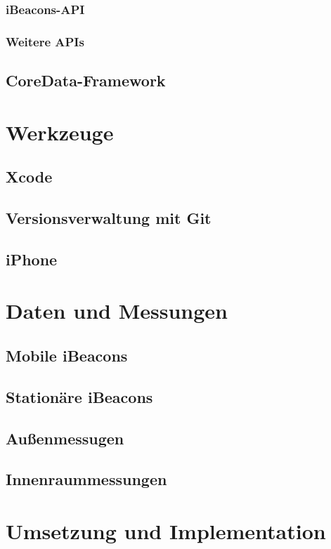 \documentclass[liststotoc,a4paper, 12pt]{scrartcl}
\begin{document}
\subsubsection{iBeacons-API}
\subsubsection{Weitere APIs}

\subsection{CoreData-Framework}


\section{Werkzeuge}
\subsection{Xcode}
\subsection{Versionsverwaltung mit Git}
\subsection{iPhone}

\section{Daten und Messungen}
\subsection{Mobile iBeacons}
\subsection{Stationäre iBeacons}
\subsection{Außenmessugen}
\subsection{Innenraummessungen}

\section{Umsetzung und Implementation}
\end{document}

